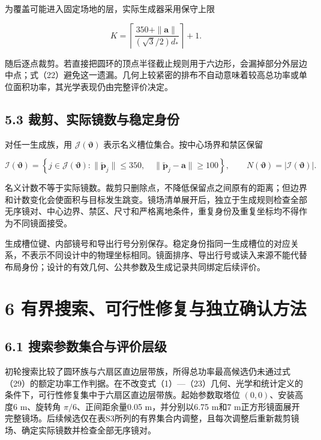 \documentclass[UTF8,fontset=windows,zihao=-4]{ctexart}
\begin{document}
\par\noindent\begin{minipage}{\linewidth}
为覆盖可能进入固定场地的层，实际生成器采用保守上限

\[
K=\left\lceil
\frac{350+\|\boldsymbol a\|}{(\sqrt3/2)d_*}
\right\rceil+1.
\tag{22}
\]
\end{minipage}\par

随后逐点裁剪。若直接把圆环的顶点半径截止规则用于六边形，会漏掉部分外层边中点；式（22）避免这一遗漏。几何上较紧密的排布不自动意味着较高总功率或单位面积功率，其光学表现仍由完整评价决定。

\subsection*{5.3 裁剪、实际镜数与稳定身份}

\par\noindent\begin{minipage}{\linewidth}
对任一生成族，用 \(\mathcal J(\boldsymbol\vartheta)\) 表示名义槽位集合。按中心场界和禁区保留

\[
\mathcal I(\boldsymbol\vartheta)=
\left\{j\in\mathcal J(\boldsymbol\vartheta):
\|\widetilde{\boldsymbol p}_j\|\le350,
\quad\|\widetilde{\boldsymbol p}_j-\boldsymbol a\|\ge100
\right\},
\qquad N(\boldsymbol\vartheta)=|\mathcal I(\boldsymbol\vartheta)|.
\tag{23}
\]
\end{minipage}\par

名义计数不等于实际镜数。裁剪只删除点，不降低保留点之间原有的距离；但边界和计数变化会使面积与目标发生跳变。镜场清单展开后，独立于生成规则检查全部无序镜对、中心边界、禁区、尺寸和严格离地条件，重复身份及重复坐标均不得作为不同镜面接受。

生成槽位键、内部镜号和导出行号分别保存。稳定身份指同一生成槽位的对应关系，不表示不同设计中的物理坐标相同。镜面排序、导出行号或读入来源不能代替布局身份；设计的有效几何、公共参数及生成记录共同绑定后续评价。

\section*{6 有界搜索、可行性修复与独立确认方法}

\subsection*{6.1 搜索参数集合与评价层级}

初轮搜索比较了圆环族与六扇区直边层带族，所得总功率最高候选仍未通过式（29）的额定功率工作判据。在不改变式（1）—（23）几何、光学和统计定义的条件下，可行性修复集中于六扇区直边层带族。起始参数取塔位 \((0,0)\)、安装高度6 m、旋转角 \(\pi/6\)、正间距余量0.05 m，并分别以6.75 m和7 m正方形镜面展开完整镜场。后续候选仅在表S3所列的有界集合内调整，且每次调整后重新裁剪镜场、确定实际镜数并检查全部无序镜对。
\end{document}
